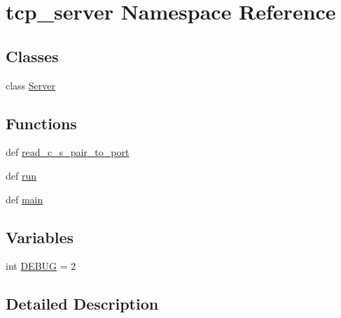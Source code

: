 \hypertarget{namespacetcp__server}{\section{tcp\-\_\-server Namespace Reference}
\label{namespacetcp__server}
}
\subsection*{Classes}
\begin{DoxyCompactItemize}
\item 
class \hyperlink{classtcp__server_1_1_server}{Server}
\end{DoxyCompactItemize}
\subsection*{Functions}
\begin{DoxyCompactItemize}
\item 
def \hyperlink{namespacetcp__server_a345a4bad31f0a853442880183b510ddc}{read\-\_\-c\-\_\-s\-\_\-pair\-\_\-to\-\_\-port}
\item 
def \hyperlink{namespacetcp__server_a9a4d4bee3a12f34288c4cc517ccf9976}{run}
\item 
def \hyperlink{namespacetcp__server_ad7647812bebfb857f5c583aad72f6c4f}{main}
\end{DoxyCompactItemize}
\subsection*{Variables}
\begin{DoxyCompactItemize}
\item 
int \hyperlink{namespacetcp__server_a50c596f6928f69e658be5f1677233f96}{D\-E\-B\-U\-G} = 2
\end{DoxyCompactItemize}


\subsection{Detailed Description}
 

